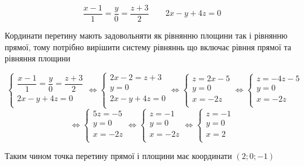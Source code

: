 {}

$$
  \dfrac{x-1}{1}=\dfrac{y}{0}=\dfrac{z+3}{2} \qquad 2x-y+4z=0
$$


Кординати перетину мають задовольняти як рівнянню площини так і рівнянню прямої, тому потрібно вирішити систему рівняннь що включає рівння прямої та рівняння площини

$$\
\begin{cases}
  \dfrac{x-1}{1}=\dfrac{y}{0}=\dfrac{z+3}{2} \\
  2x-y+4z=0\\
\end{cases}
\iff
\begin{cases}
2x-2=z+3 \\
y = 0 \\
2x-y+4z=0\\
\end{cases}
\iff
\begin{cases}
z=2x-5 \\
y = 0 \\
x=-2z\\
\end{cases}
\iff
\begin{cases}
z=-4z-5 \\
y = 0 \\
x=-2z\\
\end{cases}
$$
$$
\iff
\begin{cases}
5z=-5 \\
y = 0 \\
x=-2z\\
\end{cases}
\iff
\begin{cases}
z=-1 \\
y = 0 \\
x=-2z\\
\end{cases}
\iff
\begin{cases}
z=-1 \\
y = 0 \\
x=2\\
\end{cases}
$$

Таким чином точка перетину прямої і площини має координати $\boxed{(2;0;-1)}$
